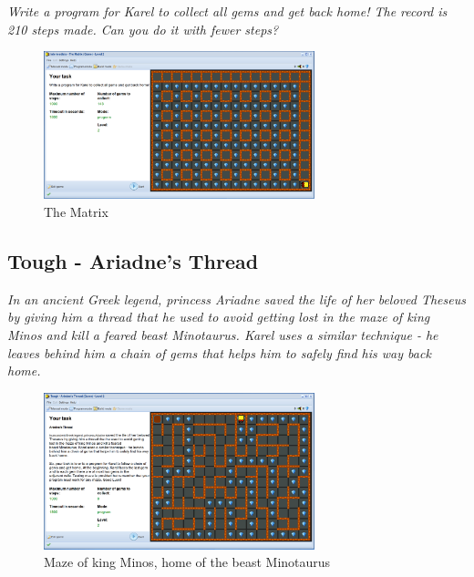 \documentclass[article,A4,12pt]{llncs}
\begin{document}
{\em Write a program for Karel to collect all gems and get back home! The record is 
210 steps made. Can you do it with fewer steps?}

\begin{figure}[!ht]
\begin{center}
\includegraphics[width=0.7\textwidth]{img/game-matrix.png}
\end{center}
\vspace{-4mm}
\caption{The Matrix}
\label{fig:matrix}
\vspace{-10mm}
\end{figure}
\noindent

\subsection{Tough - Ariadne's Thread}

{\em In an ancient Greek legend, princess Ariadne saved the life of her 
beloved Theseus by giving him a thread that he used to avoid getting lost 
in the maze of king Minos and kill a feared beast Minotaurus. Karel uses 
a similar technique - he leaves behind him a chain of gems that helps him 
to safely find his way back home. }

\begin{figure}[!ht]
\begin{center}
\includegraphics[width=0.7\textwidth]{img/game-ariadne.png}
\end{center}
\vspace{-4mm}
\caption{Maze of king Minos, home of the beast Minotaurus}
\label{fig:ariadne}
\vspace{-10mm}
\end{figure}
\noindent
\end{document}
